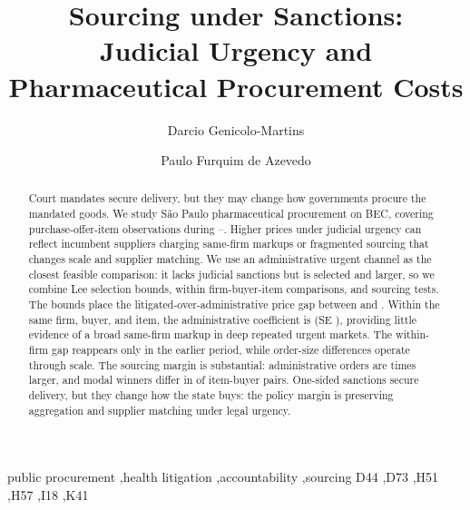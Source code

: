 \documentclass[review,11pt,authoryear]{elsarticle}
\begin{document}
\begin{frontmatter}

\title{Sourcing under Sanctions:\\ Judicial Urgency and Pharmaceutical Procurement Costs%
}

\author[INSPER]{Darcio Genicolo-Martins}
\author[INSPER]{Paulo Furquim de Azevedo}
\address[INSPER]{Insper Institute of Education and Research,
  Rua Quat\'a 300, S\~ao Paulo, SP 04546-042, Brazil}

\begin{abstract}
Court mandates secure delivery, but they may change how governments procure the mandated goods. We study S\~ao Paulo pharmaceutical procurement on BEC, covering \BPnPOIfull{} purchase-offer-item observations during \BPsampleStartYear--\BPsampleEndYear. Higher prices under judicial urgency can reflect incumbent suppliers charging same-firm markups or fragmented sourcing that changes scale and supplier matching. We use an administrative urgent channel as the closest feasible comparison: it lacks judicial sanctions but is selected and larger, so we combine Lee selection bounds, within firm-buyer-item comparisons, and sourcing tests. The bounds place the litigated-over-administrative price gap between \BPutgBoundLow{} and \BPutgBoundHigh{}. Within the same firm, buyer, and item, the administrative coefficient is \BPutgTripleCoefUTG{} (SE \BPutgTripleSEUTG{}), providing little evidence of a broad same-firm markup in deep repeated urgent markets. The within-firm gap reappears only in the earlier period, while order-size differences operate through scale. The sourcing margin is substantial: administrative orders are \BPutgQtyAdminFoldPref{} times larger, and modal winners differ in \BPwinnerSwitchDiffModalPct{} of item-buyer pairs. One-sided sanctions secure delivery, but they change how the state buys: the policy margin is preserving aggregation and supplier matching under legal urgency.
\end{abstract}

\begin{keyword}
public procurement \sep health litigation \sep accountability \sep sourcing
\JEL D44 \sep D73 \sep H51 \sep H57 \sep I18 \sep K41
\end{keyword}

\end{frontmatter}








\begingroup
\singlespacing


\endgroup
\end{document}
